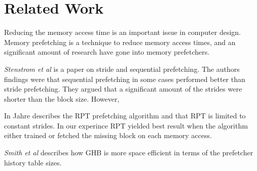 \section{Related Work}
\label{sec:related-work}

Reducing the memory access time is an important issue in computer design.
Memory prefetching is a technique to reduce memory access times,
and an significant amount of research have gone into memory prefetchers.

\textit{Stenstrom et al} \cite{bib:stride}
is a paper on stride and sequential prefetching.
The authors findings were that sequential prefetching in some cases performed better than stride prefetching.
They argued that a significant amount of the strides were shorter than the block size.
However, 

In \cite{bib:jahre}
Jahre describes the RPT prefetching algorithm and that RPT is limited to constant strides.
In our experince RPT yielded best result when the algorithm either trained or fetched the missing block on each memory access.

\textit{Smith et al} \cite{bib:ghb}
describes how GHB is more space efficient in terms of the prefetcher history table sizes.





